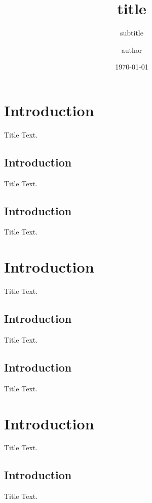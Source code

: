 \documentclass{beamer}
\date{\today}
\title{title}
\author{author}
\subtitle{subtitle}
\institute{institute}
\begin{document}
    \maketitle

    \section{Introduction}
    \begin{frame}{Title}
        Text.
    \end{frame}
    \subsection{Introduction}
    \begin{frame}{Title}
        Text.
    \end{frame}
    \subsection{Introduction}
    \begin{frame}{Title}
        Text.
    \end{frame}

    \section{Introduction}
    \begin{frame}{Title}
        Text.
    \end{frame}
    \subsection{Introduction}
    \begin{frame}{Title}
        Text.
    \end{frame}
    \subsection{Introduction}
    \begin{frame}{Title}
        Text.
    \end{frame}

    \section{Introduction}
    \begin{frame}{Title}
        Text.
    \end{frame}
    \subsection{Introduction}
    \begin{frame}{Title}
        Text.
    \end{frame}
\end{document}
